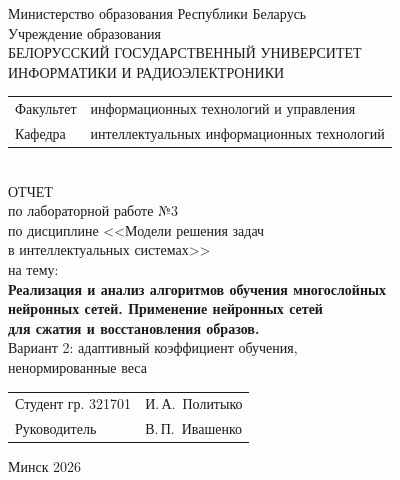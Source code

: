 \begin{titlepage}
	\begin{center}
		Министерство образования Республики Беларусь\\[1em]
		Учреждение образования\\
		БЕЛОРУССКИЙ ГОСУДАРСТВЕННЫЙ УНИВЕРСИТЕТ \\
		ИНФОРМАТИКИ И РАДИОЭЛЕКТРОНИКИ\\[1em]
		
		\begin{minipage}{\textwidth}
			\begin{flushleft}
				\begin{tabular}{ l l }
					Факультет & информационных технологий и управления\\
					Кафедра   & интеллектуальных информационных технологий
				\end{tabular}
			\end{flushleft}
		\end{minipage}\\[1em]
		
		{ОТЧЕТ}\\
		{по лабораторной работе №3}\\
		{по дисциплине <<Модели решения задач}\\
		{в интеллектуальных системах>>}\\
		{на тему:}\\[1em]
		\textbf{Реализация и анализ алгоритмов обучения многослойных}\\
		\textbf{нейронных сетей. Применение нейронных сетей}\\
		\textbf{для сжатия и восстановления образов.}\\[1em]
		Вариант 2: адаптивный коэффициент обучения,\\
		ненормированные веса\\[1em]
		
		\vspace{2em}
		\begin{tabular}{ p{}p{} }
			Студент гр. 321701 & И.\,А.~Политыко \\
			Руководитель & В.\,П.~Ивашенко \\
		\end{tabular}
		
		\vfill
		{\normalsize Минск 2026}
	\end{center}
\end{titlepage}
